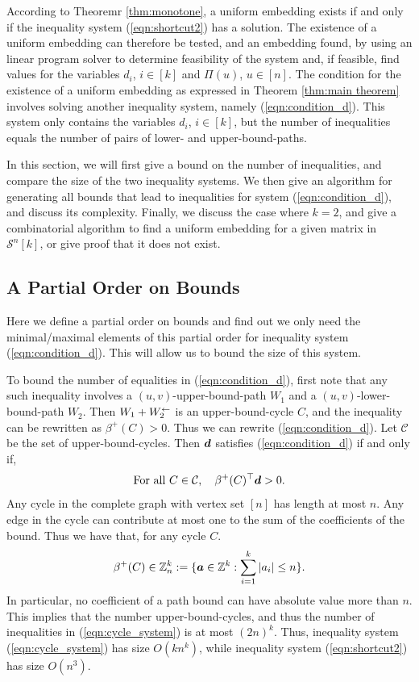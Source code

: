 \documentclass[runningheads]{llncs}
\begin{document}
According to Theoremr \ref{thm:monotone}, a uniform embedding exists if and only if the inequality system (\ref{eqn:shortcut2}) has a solution. The existence of a uniform embedding can therefore be tested, and an embedding found, by using an linear program solver to determine feasibility of the system and, if feasible, find values for the variables $d_i$, $i\in [k]$ and $\Pi (u)$, $u\in [n]$. The condition for the existence of a uniform embedding as expressed in Theorem \ref{thm:main theorem} involves solving another inequality system, namely (\ref{eqn:condition_d}). This system only contains the variables $d_i$, $i\in [k]$, but the number of inequalities equals the number of pairs of lower- and upper-bound-paths. 

In this section, we will first give a bound on the number of inequalities, and compare the size of the two inequality systems. We then give an algorithm for generating all bounds that lead to inequalities for system (\ref{eqn:condition_d}), and discuss its complexity. Finally, we discuss the case where $k=2$, and give a combinatorial algorithm to find a uniform embedding for a given matrix in $\mathcal{S}^n[k]$, or give proof that it does not exist. 



%

\subsection{A Partial Order on Bounds}


Here we define a partial order on bounds and find out we only need the minimal/maximal elements of this partial order for inequality system (\ref{eqn:condition_d}). This will allow us to bound the size of this system.

To bound the number of equalities in (\ref{eqn:condition_d}), first note that any
such inequality  involves a $(u,v)$-upper-bound-path $W_1$ and a $(u,v)$-lower-bound-path $W_2$. Then $W_1+W_2^{\leftarrow}$ is an upper-bound-cycle $C$, and the inequality can be rewritten as
$\beta^+(C)>0$. Thus we can rewrite (\ref{eqn:condition_d}). Let $\mathcal{C}$ be the set of upper-bound-cycles. Then $\boldsymbol d$ satisfies (\ref{eqn:condition_d}) if and only if, 
\begin{equation}\label{eqn:cycle_system}
\mbox{For all }C\in\mathcal{C},\quad \beta^+(C)^\top\boldsymbol d>0.
\end{equation}
Any cycle in the complete graph with vertex set $[n]$ has length at most $n$. Any edge in the cycle can contribute at most one to the sum of the coefficients of the bound. Thus we have that, for any cycle $C$.
$$
\beta^+(C)\in \mathbb Z^k_n:=\{ \boldsymbol a\in\mathbb Z^k: \sum_{i=1}^k |a_i|\leq n\}.
$$
In particular, no coefficient of a path bound can have absolute value more than $n$. This implies that the number upper-bound-cycles, and thus the number of inequalities in (\ref{eqn:cycle_system}) is at most $(2n)^k$. 
Thus, inequality system (\ref{eqn:cycle_system}) has size $O(kn^k)$, while inequality system (\ref{eqn:shortcut2}) has size $O(n^3)$.
\end{document}
